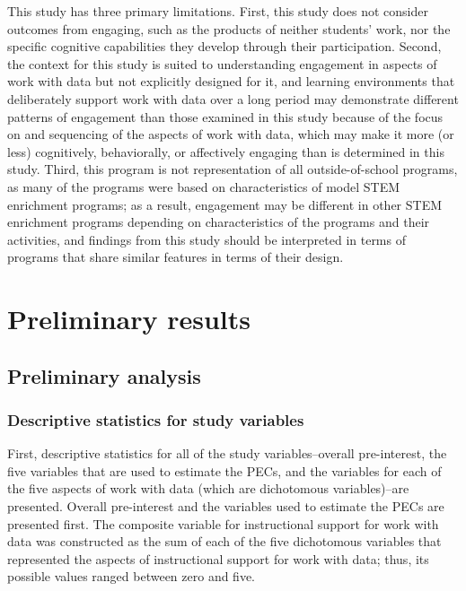 \documentclass[]{book}
\theoremstyle{definition}
\theoremstyle{definition}
\theoremstyle{definition}
\theoremstyle{remark}
\begin{document}
This study has three primary limitations. First, this study does not
consider outcomes from engaging, such as the products of neither
students' work, nor the specific cognitive capabilities they develop
through their participation. Second, the context for this study is
suited to understanding engagement in aspects of work with data but not
explicitly designed for it, and learning environments that deliberately
support work with data over a long period may demonstrate different
patterns of engagement than those examined in this study because of the
focus on and sequencing of the aspects of work with data, which may make
it more (or less) cognitively, behaviorally, or affectively engaging
than is determined in this study. Third, this program is not
representation of all outside-of-school programs, as many of the
programs were based on characteristics of model STEM enrichment
programs; as a result, engagement may be different in other STEM
enrichment programs depending on characteristics of the programs and
their activities, and findings from this study should be interpreted in
terms of programs that share similar features in terms of their design.

\chapter{Preliminary results}\label{preliminary-results}

\section{Preliminary analysis}\label{preliminary-analysis}

\subsection{Descriptive statistics for study
variables}\label{descriptive-statistics-for-study-variables}

First, descriptive statistics for all of the study variables--overall
pre-interest, the five variables that are used to estimate the PECs, and
the variables for each of the five aspects of work with data (which are
dichotomous variables)--are presented. Overall pre-interest and the
variables used to estimate the PECs are presented first. The composite
variable for instructional support for work with data was constructed as
the sum of each of the five dichotomous variables that represented the
aspects of instructional support for work with data; thus, its possible
values ranged between zero and five.
\end{document}
